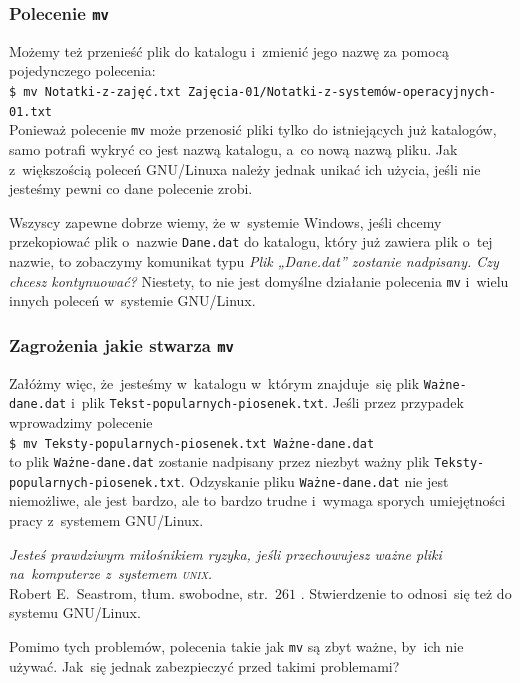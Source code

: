 \documentclass[10pt,t]{beamer}
\begin{document}
\begin{frame}
  \frametitle{Polecenie \texttt{mv}}


  Możemy też przenieść plik do katalogu i~zmienić jego nazwę za pomocą
  pojedynczego polecenia: \\
  \texttt{\$ mv Notatki-z-zajęć.txt
    Zajęcia-01/Notatki-z-systemów-operacyjnych-01.txt} \\
  Ponieważ polecenie \texttt{mv} może przenosić pliki tylko do istniejących
  już katalogów, samo potrafi wykryć co jest nazwą katalogu, a~co nową
  nazwą pliku. Jak z~większością poleceń GNU/Linuxa należy jednak unikać
  ich użycia, jeśli nie jesteśmy pewni co dane polecenie zrobi.

  Wszyscy zapewne dobrze wiemy, że w~systemie Windows, jeśli chcemy
  przekopiować plik o~nazwie \texttt{Dane.dat} do katalogu, który już
  zawiera plik o~tej nazwie, to zobaczymy komunikat typu
  \textit{Plik „Dane.dat” zostanie nadpisany. Czy chcesz kontynuować?}
  Niestety, to \alert{nie} jest domyślne działanie polecenia \texttt{mv}
  i~wielu innych poleceń w~systemie GNU/Linux.

\end{frame}





\begin{frame}
  \frametitle{Zagrożenia jakie stwarza \texttt{mv}}


  Załóżmy więc, że~jesteśmy w~katalogu w~którym znajduje~się plik
  \texttt{Ważne-dane.dat} i~plik \texttt{Tekst-popularnych-piosenek.txt}.
  Jeśli przez przypadek wprowadzimy polecenie \\
  \texttt{\$ mv Teksty-popularnych-piosenek.txt Ważne-dane.dat} \\
  to plik \texttt{Ważne-dane.dat} zostanie nadpisany przez niezbyt ważny
  plik \texttt{Teksty-popularnych-piosenek.txt}. Odzyskanie pliku
  \texttt{Ważne-dane.dat} nie jest niemożliwe, ale jest bardzo, ale to
  \alert{bardzo} trudne i~wymaga sporych umiejętności pracy z~systemem
  GNU/Linux.

  \textit{Jesteś prawdziwym miłośnikiem ryzyka, jeśli przechowujesz ważne
    pliki na~komputerze z~systemem \textsc{unix}.} \\
  Robert E.~Seastrom, tłum. swobodne, str.~$261$
  \parencite{Garfinkel-Weise-Strassmann-The-UNIX-HATERS-Handbook-Pub-1994}.
  Stwierdzenie to odnosi~się też do systemu GNU/Linux.

  Pomimo tych problemów, polecenia takie jak \texttt{mv} są zbyt ważne,
  by~ich nie używać. Jak~się jednak zabezpieczyć przed takimi problemami?

\end{frame}
\end{document}
